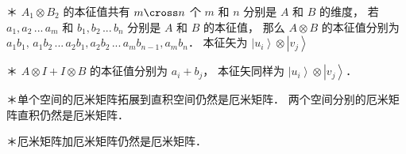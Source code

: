 ＊ ${A_1} \otimes {B_2}$ 的本征值共有 $m \cross n$ 个 $m$ 和 $n$ 分别是 $A$ 和 $B$ 的维度， 若 ${a_1},{a_2}\,...\,{a_m}$ 和 ${b_1},{b_2}\,...\,{b_n}$ 分别是 $A$ 和 $B$ 的本征值， 那么 $A \otimes B$ 的本征值分别为 ${a_1}{b_1},\,{a_1}{b_2}\,...\,{a_2}{b_1},{a_2}{b_2}\,...\,{a_m}{b_{n - 1}},{a_m}{b_n}$．  本征矢为 $\left| {{u_i}} \right\rangle  \otimes \left| {{v_j}} \right\rangle $ 

＊ $A \otimes I + I \otimes B$ 的本征值分别为 ${a_i} + {b_j}$，  本征矢同样为 $\left| {{u_i}} \right\rangle  \otimes \left| {{v_j}} \right\rangle $． 

＊单个空间的厄米矩阵拓展到直积空间仍然是厄米矩阵． 两个空间分别的厄米矩阵直积仍然是厄米矩阵． 

＊厄米矩阵加厄米矩阵仍然是厄米矩阵．

